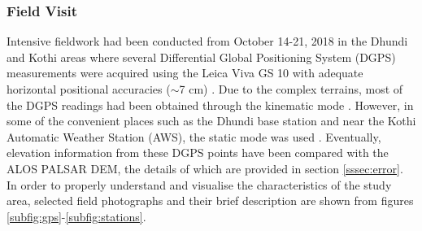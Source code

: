 \documentclass[12pt]{elsarticle}
\numberwithin{equation}{section}
\numberwithin{figure}{section}
\numberwithin{table}{section}
\begin{document}
\subsubsection{Field Visit}
\label{sssec:field}
Intensive fieldwork had been conducted from October 14-21, 2018 in the Dhundi and Kothi areas where several Differential Global Positioning System (DGPS) measurements were acquired using the Leica Viva GS 10 \citep{LeicaGeosystemsAG2012} with adequate horizontal positional accuracies ($\sim$7 cm) \citep{Majumdar2019}. Due to the complex terrains, most of the DGPS readings had been obtained through the kinematic mode \citep{Luo2014}. However, in some of the convenient places such as the Dhundi base station and near the Kothi Automatic Weather Station (AWS), the static mode was used \citep{LeicaGeosystemsAG2012}. Eventually, elevation information from these DGPS points have been compared with the ALOS PALSAR DEM, the details of which are provided in section \ref{sssec:error}. In order to properly understand and visualise the characteristics of the study area, selected field photographs and their brief description are shown from figures \ref{subfig:gps}-\ref{subfig:stations}.
\end{document}
